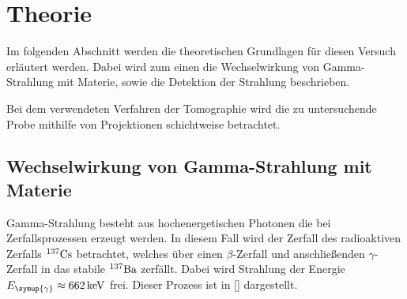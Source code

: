 \section{Theorie}
\label{sec:theorie}

    Im folgenden Abschnitt werden die theoretischen Grundlagen für diesen Versuch erläutert werden.
    Dabei wird zum einen die Wechselwirkung von Gamma-Strahlung mit Materie,
    sowie die Detektion der Strahlung beschrieben.

    Bei dem verwendeten Verfahren der Tomographie wird die zu untersuchende Probe mithilfe von Projektionen schichtweise betrachtet.

\subsection{Wechselwirkung von Gamma-Strahlung mit Materie}

    Gamma-Strahlung besteht aus hochenergetischen Photonen die bei Zerfallsprozessen erzeugt werden.
    In diesem Fall wird der Zerfall des radioaktiven Zerfalls $^{137}\ce{Cs}$ betrachtet,
    welches über einen $\beta$-Zerfall und anschließenden $\gamma$-Zerfall in das stabile $^{137}\ce{Ba}$ zerfällt.
    Dabei wird Strahlung der Energie $E_{\symup{\gamma}} \approx \SI{662}{\kilo\eV}$ \cite{caesium} frei.
    Dieser Prozess ist in \autoref{} dargestellt.

